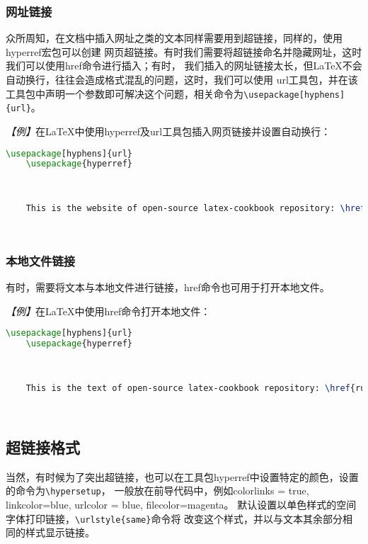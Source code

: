 \subsubsection{网址链接}

众所周知，在文档中插入网址之类的文本同样需要用到超链接，同样的，使用hyperref宏包可以创建
网页超链接。有时我们需要将超链接命名并隐藏网址，这时我们可以使用href命令进行插入；有时，
我们插入的网址链接太长，但LaTeX不会自动换行，往往会造成格式混乱的问题，这时，我们可以使用
url工具包，并在该工具包中声明一个参数即可解决这个问题，相关命令为\texttt{\textbackslash{}usepackage[hyphens]\{url\}}。

\emph{【例】}在LaTeX中使用hyperref及url工具包插入网页链接并设置自动换行：
\begin{lstlisting}[language=TeX]
    \usepackage[hyphens]{url}
    \usepackage{hyperref}

    

    This is the website of open-source latex-cookbook repository: \href{https://github.com/xinychen/latex-cookbook}{LaTeX-cookbook} or go to the next url: \url{https://github.com/xinychen/latex-cookbook}.

    
\end{lstlisting}

\subsubsection{本地文件链接}

有时，需要将文本与本地文件进行链接，href命令也可用于打开本地文件。

\emph{【例】}在LaTeX中使用href命令打开本地文件：
\begin{lstlisting}[language=TeX]
    \usepackage[hyphens]{url}
    \usepackage{hyperref}

    

    This is the text of open-source latex-cookbook repository: \href{run:./LaTeX-cookbook.dox}{LaTeX-cookbook}.

    
\end{lstlisting}

\subsection{超链接格式}

当然，有时候为了突出超链接，也可以在工具包hyperref中设置特定的颜色，设置的命令为\texttt{\textbackslash{}hypersetup}，
一般放在前导代码中，例如colorlinks = true, linkcolor=blue, urlcolor = blue, filecolor=magenta。
默认设置以单色样式的空间字体打印链接，\texttt{\textbackslash{}urlstyle\{same\}}命令将
改变这个样式，并以与文本其余部分相同的样式显示链接。

